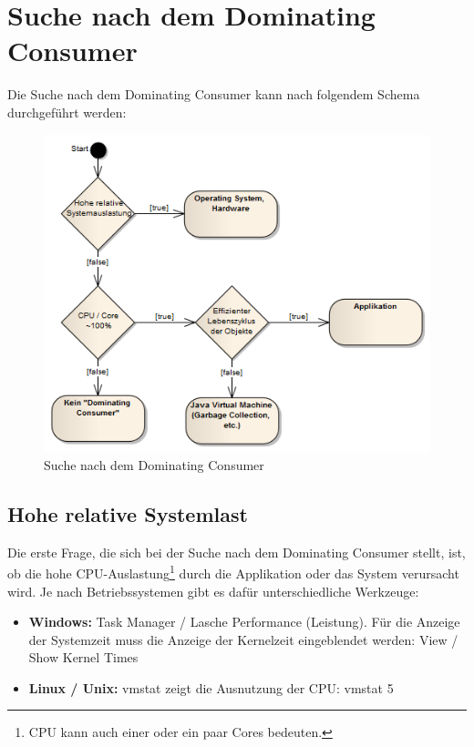 \section{Suche nach dem Dominating Consumer}\label{dominating_consumer}
Die Suche nach dem Dominating Consumer kann nach folgendem Schema durchgeführt werden:
\begin{figure}[H]
  	\centering
    	\includegraphics[width=13.1cm]{images/dominating_consumer}
        	\caption{Suche nach dem Dominating Consumer}
\end{figure}

\subsection{Hohe relative Systemlast}\label{hohe_systemauslastung}
Die erste Frage, die sich bei der Suche nach dem Dominating Consumer stellt, ist, ob die hohe CPU-Auslastung\footnote{CPU kann auch einer oder ein paar Cores bedeuten.} durch die Applikation oder das System verursacht wird. Je nach Betriebssystemen gibt es dafür unterschiedliche Werkzeuge:
\begin{itemize}
	\item \textbf{Windows:} Task Manager / Lasche Performance (Leistung). Für die Anzeige der Systemzeit muss die Anzeige der Kernelzeit eingeblendet werden: View / Show Kernel Times
	\item \textbf{Linux / Unix: } vmstat zeigt die Ausnutzung der CPU: vmstat 5
\end{itemize}

